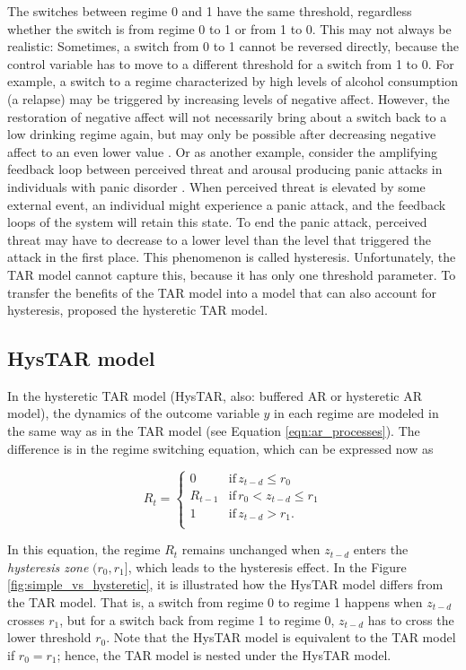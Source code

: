 \documentclass{article}
\begin{document}
The switches between regime 0 and 1 have the same threshold, regardless whether the switch is from regime 0 to 1 or from 1 to 0. 
This may not always be realistic: Sometimes, a switch from 0 to 1 cannot be reversed directly, because the control variable has to move to a different threshold for a switch from 1 to 0.
For example, a switch to a regime characterized by high levels of alcohol consumption (a relapse) may be triggered by increasing levels of negative affect.
However, the restoration of negative affect will not necessarily bring about a switch back to a low drinking regime again, but may only be possible after decreasing negative affect to an even lower value \citep{alcohol_example}.
Or as another example, consider the amplifying feedback loop between perceived threat and arousal producing panic attacks in individuals with panic disorder \citep{panic_disorder}.
When perceived threat is elevated by some external event, an individual might experience a panic attack, and the feedback loops of the system will retain this state.
To end the panic attack, perceived threat may have to decrease to a lower level than the level that triggered the attack in the first place.
This phenomenon is called hysteresis.
Unfortunately, the TAR model cannot capture this, because it has only one threshold parameter.
To transfer the benefits of the TAR model into a model that can also account for hysteresis, \citet{bar2} proposed the hysteretic TAR model.

\subsection{HysTAR model}
In the hysteretic TAR model (HysTAR, also: buffered AR or hysteretic AR model), the dynamics of the outcome variable $y$ in each regime are modeled in the same way as in the TAR model (see Equation \ref{eqn:ar_processes}). The difference is in the regime switching equation, which can be expressed now as

\begin{equation} \label{eqn:hysteretic_switching}
R_t = \begin{cases}
0 & \mathrm{if} \, z_{t-d} \le r_0 \\
R_{t-1} & \mathrm{if} \, r_0 < z_{t-d} \le r_1 \\
1 & \mathrm{if} \, z_{t-d} > r_1. \\
\end{cases}
\end{equation}

In this equation, the regime $R_t$ remains unchanged when $z_{t-d}$ enters the \textit{hysteresis zone} $(r_0, r_1]$, which leads to the hysteresis effect. In the Figure \ref{fig:simple_vs_hysteretic}, it is illustrated how the HysTAR model differs from the TAR model.
That is, a switch from regime 0 to regime 1 happens when $z_{t-d}$ crosses $r_1$, but for a switch back from regime 1 to regime 0, $z_{t-d}$ has to cross the lower threshold $r_0$.
Note that the HysTAR model is equivalent to the TAR model if $r_0 = r_1$; hence, the TAR model is nested under the HysTAR model.
\end{document}
